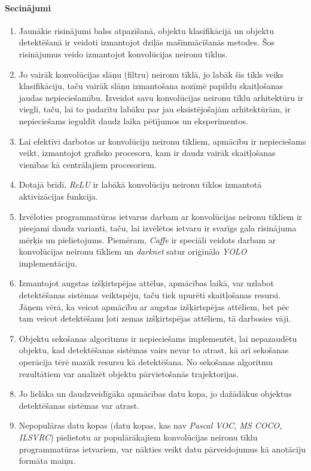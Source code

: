 \paragraph{Secinājumi}
\hfill\par
\begin{enumerate}
	\item Jaunākie risinājumi balss atpazīšanā, objektu klasifikācijā un objektu detektēšanā ir veidoti izmantojot dziļās mašīnmācīšanās metodes. Šos risinājumus veido izmantojot konvolūcijas neironu tīklus.
	\item Jo vairāk konvolūcijas slāņu (filtru) neironu tīklā, jo labāk šis tīkls veiks klasifikāciju, taču vairāk slāņu izmantošana nozīmē papildu skaitļošanas jaudas nepieciešamību. Izveidot savu konvolūcijas neironu tīklu arhitektūru ir viegli, taču, lai to padarītu labāku par jau eksistējošajām arhitektūrām, ir nepieciešams ieguldīt daudz laika pētījumos un eksperimentos.
	\item Lai efektīvi darbotos ar konvolūciju neironu tīkliem, apmācību ir nepieciešams veikt, izmantojot grafisko procesoru, kam ir daudz vairāk skaitļošanas vienības kā centrālajiem procesoriem.
	\item Dotajā brīdī, \textit{ReLU} ir labākā konvolūciju neironu tīklos izmantotā aktivizācijas funkcija. 
	\item Izvēloties programmatūras ietvarus darbam ar konvolūcijas neironu tīkliem ir pieejami daudz varianti, taču, lai izvēlētos ietvaru ir svarīgs gala risinājuma mērķis un pielietojums. Piemēram, \textit{Caffe} ir speciāli veidots darbam ar konvolūcijas neironu tīkliem un \textit{darknet} satur oriģinālo \textit{YOLO} implementāciju. 
	\item Izmantojot augstas izšķirtspējas attēlus, apmācības laikā, var uzlabot detektēšanas sistēmas veiktspēju, taču tiek upurēti skaitļošanas resursi. Jāņem vērā, ka veicot apmācību ar augstas izšķirtspējas attēliem, bet pēc tam veicot detektēšanu ļoti zemas izšķirtspējas attēliem, tā darbosies vāji.
	\item Objektu sekošanas algoritmus ir nepieciešams implementēt, lai nepazaudētu objektu, kad detektēšanas sistēmas vairs nevar to atrast, kā arī sekošanas operācija tērē mazāk resursu kā detektēšana. No sekošanas algoritmu rezultātiem var analizēt objektu pārvietošanās trajektorijas.
	\item Jo lielāka un daudzveidīgāka apmācības datu kopa, jo dažādākus objektus detektēšanas sistēmas var atrast.
	\item Nepopulāras datu kopas (datu kopas, kas nav \textit{Pascal VOC, MS COCO, ILSVRC}) pielietotu ar populārākajiem konvolūcijas neironu tīklu programmatūras ietvariem, var nākties veikt datu pārveidojumus kā anotāciju formāta maiņu.

\end{enumerate}
